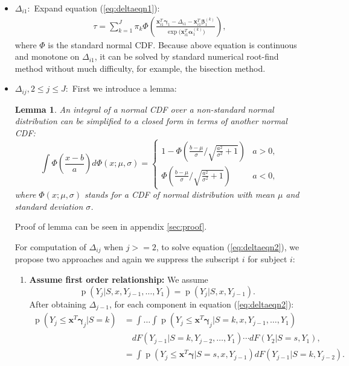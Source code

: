 \documentclass[12pt]{article}
\newtheorem{lem}[thm]{Lemma}
\DeclareMathOperator{\pr}{p}
\begin{document}
\begin{itemize}
\item \textbf{$\Delta_{i1}: $} Expand equation (\ref{eq:deltaeqn1}):
  \begin{align*}
    \tau = \sum_{k = 1}^J \pi_k \Phi \left( \frac{\bm x_{i1}^T \bm
        \gamma_1 - \Delta_{i1} - \bm x_{i1}^T\bm \beta_1^{(k)}}{\exp
        \big( \bm x_{i1}^T \bm \alpha_1^{(k)} \big)} \right),
  \end{align*}
  where $\Phi$ is the standard normal CDF. Because above equation is
  continuous and monotone on $\Delta_{i1}$, it can be solved by
  standard numerical root-find method without much difficulty, for
  example, the bisection method.

\item \textbf{$\Delta_{ij}, 2\leq j \leq J: $} First we introduce a lemma:
  \begin{lem}\label{sec:lemma}
    An integral of a normal CDF over a non-standard normal
    distribution can be simplified to a closed form in terms of
    another normal CDF:
    \begin{equation}
      \label{eq:lem}
      \int \Phi \left( \frac{x-b}{a} \right) d\Phi(x; \mu, \sigma)  = 
      \begin{cases}
        1- \Phi \left( \frac{b-\mu}{\sigma} \big / \sqrt{\frac{a^2}{\sigma^2}+1} \right) & a > 0, \\
        \Phi \left( \frac{b-\mu}{\sigma} \big / \sqrt{\frac{a^2}{\sigma^2}+1} \right) &
        a < 0 ,
      \end{cases}
    \end{equation}
    where $\Phi(x; \mu, \sigma)$ stands for a CDF of normal distribution with
    mean $\mu$ and standard deviation $\sigma$.
  \end{lem}
  Proof of lemma can be seen in appendix \ref{sec:proof}.

  For computation of $\Delta_{ij}$ when $j >= 2$, to solve equation
  (\ref{eq:deltaeqn2}), we propose two approaches and again we
  suppress the subscript $i$ for subject $i$:

  \begin{enumerate}
  \item \textbf{Assume first order relationship:} We assume
    \begin{equation*}
      \pr (Y_j|S, x, Y_{j-1}, \ldots, Y_1) = \pr (Y_j|S, x, Y_{j-1}).
    \end{equation*}
    After obtaining $\Delta_{j-1}$, for each component in equation
    (\ref{eq:deltaeqn2}):
    \begin{align*}
      \pr (Y_j \leq \bm x^T \bm \gamma_j | S = k) & = \int\dots\int
      \pr (Y_j \leq \bm x^T\bm \gamma_j | S=k, x, Y_{j-1}, \ldots, Y_1)\\
      & \quad  dF(Y_{j-1}|S=k, Y_{j-2}, \ldots, Y_1)\cdots dF(Y_2|S=s, Y_1),\\
      & = \int \pr (Y_j \leq \bm x^T \bm \gamma | S=s, x, Y_{j-1}) dF(Y_{j-1}|S=k,
      Y_{j-2}).
    \end{align*}


\end{enumerate}
\end{itemize}
\end{document}
